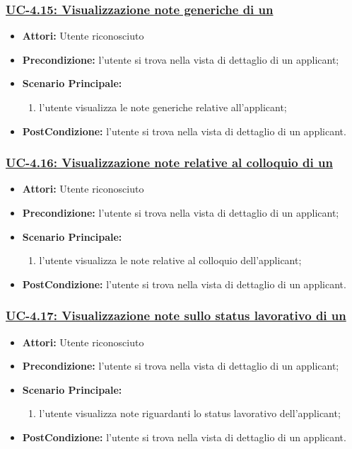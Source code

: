 \subsubsection{\underline{UC-4.15: Visualizzazione note generiche di un \applicant}}
\begin{itemize}
	\item \textbf{Attori:} Utente riconosciuto
	\item \textbf{Precondizione:} l'utente si trova nella vista di dettaglio di un applicant;
	\item \textbf{Scenario Principale:}
	\begin{enumerate} 
		\item l'utente visualizza le note generiche relative all'applicant;
	\end{enumerate}
	\item \textbf{PostCondizione:} l'utente si trova nella vista di dettaglio di un applicant.
\end{itemize}

\subsubsection{\underline{UC-4.16: Visualizzazione note relative al colloquio di un \applicant}}
\begin{itemize}
	\item \textbf{Attori:} Utente riconosciuto
	\item \textbf{Precondizione:} l'utente si trova nella vista di dettaglio di un applicant;
	\item \textbf{Scenario Principale:}
	\begin{enumerate} 
		\item l'utente visualizza le note relative al colloquio dell'applicant;
	\end{enumerate}
	\item \textbf{PostCondizione:} l'utente si trova nella vista di dettaglio di un applicant.
\end{itemize}


\subsubsection{\underline{UC-4.17: Visualizzazione note sullo status lavorativo di un \applicant}}
\begin{itemize}
	\item \textbf{Attori:} Utente riconosciuto
	\item \textbf{Precondizione:} l'utente si trova nella vista di dettaglio di un applicant;
	\item \textbf{Scenario Principale:}
	\begin{enumerate} 
		\item l'utente visualizza note riguardanti lo status lavorativo dell'applicant;
	\end{enumerate}
	\item \textbf{PostCondizione:} l'utente si trova nella vista di dettaglio di un applicant.
\end{itemize}


